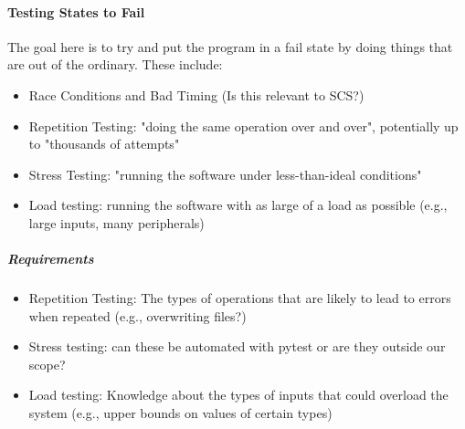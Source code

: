 \paragraph{Testing States to Fail \cite[p.~84-87]{patton_software_2006}}

The goal here is to try and put the program in a fail state by doing things
that are out of the ordinary. These include:

\begin{itemize}
      \item Race Conditions and Bad Timing \cite[p.~85-86]{patton_software_2006}
            (Is this relevant to SCS?)
      \item Repetition Testing: "doing the same operation over and over",
            potentially up to "thousands of attempts"
            \cite[p.~86]{patton_software_2006}
      \item Stress Testing: "running the software under less-than-ideal conditions"
            \cite[p.~86]{patton_software_2006}
      \item Load testing: running the software with as large of a load as
            possible (e.g., large inputs, many peripherals)
            \cite[p.~86]{patton_software_2006}
\end{itemize}

\subparagraph{Requirements}
\begin{itemize}
      \item Repetition Testing: The types of operations that are likely to lead
            to errors when repeated (e.g., overwriting files?)
      \item Stress testing: can these be automated with pytest or are they
            outside our scope? %
      \item Load testing: Knowledge about the types of inputs that could
            overload the system (e.g., upper bounds on values of certain types)
\end{itemize}